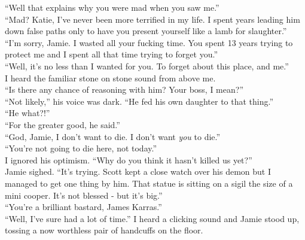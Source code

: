 \documentclass[a5paper]{scrartcl}
\begin{document}
\enquote{Well that explains why you were mad when you saw me.}\\


\enquote{Mad? Katie, I've never been more terrified in my life. I spent years leading him down false paths only to have you present yourself like a lamb for slaughter.}\\


\enquote{I'm sorry, Jamie. I wasted all your fucking time.  You spent 13 years trying to protect me and I spent all that time trying to forget you.} \\


\enquote{Well, it's no less than I wanted for you. To forget about this place, and me.}\\


I heard the familiar stone on stone sound from above me. \\


\enquote{Is there any chance of reasoning with him? Your boss, I mean?}\\


\enquote{Not likely,} his voice was dark. \enquote{He fed his own daughter to that thing.}\\


\enquote{He what?!}\\


\enquote{For the greater good, he said.}\\


\enquote{God, Jamie, I don't want to die. I don't want \textit{you} to die.}\\


\enquote{You're not going to die here, not today.}\\


I ignored his optimism. \enquote{Why do you think it hasn't killed us yet?}\\


Jamie sighed. \enquote{It's trying. Scott kept a close watch over his demon but I managed to get one thing by him. That statue is sitting on a sigil the size of a mini cooper. It's not blessed - but it's big.}\\


\enquote{You're a brilliant bastard, James Karras.}\\


\enquote{Well, I've sure had a lot of time.} I heard a clicking sound and Jamie stood up, tossing a now worthless pair of handcuffs on the floor.\\
\end{document}

